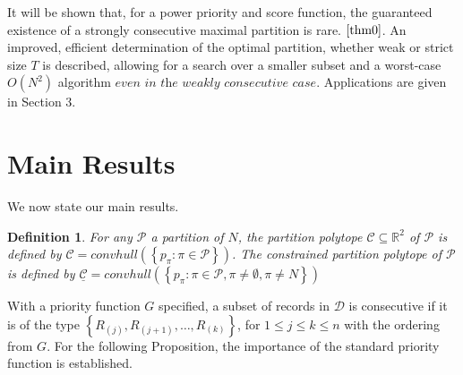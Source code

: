 \documentclass{article}
\newtheorem{definition}{Definition}
\theoremstyle{case}
\begin{document}
\vspace{4pt}

It will be shown that, for a power priority and score function, the guaranteed existence of a strongly consecutive maximal partition is rare. $\ref{thm0}$. An improved, efficient determination of the optimal partition, whether weak or strict size $T$ is described, allowing for a search over a smaller subset and a worst-case $O(N^2)$ algorithm $\textit{even in the weakly consecutive case}$. Applications are given in Section 3.

\section{Main Results}
We now state our main results. 

\begin{definition}
For any $\mathcal{P}$ a partition of $N$, the partition polytope $\mathcal{C} \subseteq \mathbb{R}^2$ of $\mathcal{P}$ is defined by $\mathcal{C} = convhull \left( \left\lbrace p_\pi : \pi \in \mathcal{P}\right\rbrace \right)$. The constrained partition polytope of $\mathcal{P}$ is defined by $\underline{\mathcal{C}} = convhull \left( \left\lbrace p_\pi : \pi \in \mathcal{P}, \pi \neq \emptyset , \pi \neq N\right\rbrace \right)$
\end{definition}

With a priority function $G$ specified, a subset of records in $\mathcal{D}$ is consecutive if it is of the type $\left\lbrace R_{(j)}, R_{(j+1)}, \dots, R_{(k)}\right\rbrace$, for $1 \leq j \leq k \leq n$ with the ordering from $G$. For the following Proposition, the importance of the standard priority function is established.
\end{document}
